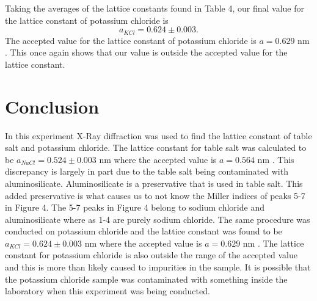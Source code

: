 \documentclass[twocolumn]{article}
\begin{document}
\newpage
Taking the averages of the lattice constants found in Table 4, our final value for the lattice constant of potassium chloride is
\begin{equation}
a_{KCl}=0.624\pm0.003.
\end{equation}
The accepted value for the lattice constant of potassium chloride is $a=0.629$ nm \cite{WikiLattice}. This once again shows that our value is outside the accepted value for the lattice constant.
\section*{Conclusion}
In this experiment X-Ray diffraction was used to find the lattice constant of table salt and potassium chloride. The lattice constant for table salt was calculated to be $a_{NaCl}=0.524\pm0.003$ nm where the accepted value is $a=0.564$ nm \cite{WikiLattice}. This discrepancy is largely in part due to the table salt being contaminated with aluminosilicate. Aluminosilicate is a preservative that is used in table salt. This added preservative is what causes us to not know the Miller indices of peaks 5-7 in Figure 4. The 5-7 peaks in Figure 4 belong to sodium chloride and aluminosilicate where as 1-4 are purely sodium chloride. The same procedure was conducted on potassium chloride and the lattice constant was found to be $a_{KCl}=0.624\pm0.003$ nm where the accepted value is  $a=0.629$ nm \cite{WikiLattice}. The lattice constant for potassium chloride is also outside the range of the accepted value and this is more than likely caused to impurities in the sample. It is possible that the potassium chloride sample was contaminated with something inside the laboratory when this experiment was being conducted. 
\newpage
\end{document}
